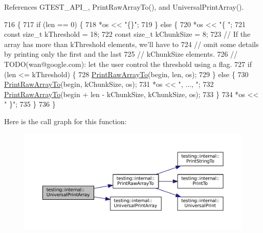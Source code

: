 References G\+T\+E\+S\+T\+\_\+\+A\+P\+I\+\_\+, Print\+Raw\+Array\+To(), and Universal\+Print\+Array().


\begin{DoxyCode}
716                                                                      \{
717   \textcolor{keywordflow}{if} (len == 0) \{
718     *os << \textcolor{stringliteral}{"\{\}"};
719   \} \textcolor{keywordflow}{else} \{
720     *os << \textcolor{stringliteral}{"\{ "};
721     \textcolor{keyword}{const} \textcolor{keywordtype}{size\_t} kThreshold = 18;
722     \textcolor{keyword}{const} \textcolor{keywordtype}{size\_t} kChunkSize = 8;
723     \textcolor{comment}{// If the array has more than kThreshold elements, we'll have to}
724     \textcolor{comment}{// omit some details by printing only the first and the last}
725     \textcolor{comment}{// kChunkSize elements.}
726     \textcolor{comment}{// TODO(wan@google.com): let the user control the threshold using a flag.}
727     \textcolor{keywordflow}{if} (len <= kThreshold) \{
728       \hyperlink{namespacetesting_1_1internal_ad3013b6b4c825edee9fe18ff1d982faa}{PrintRawArrayTo}(begin, len, os);
729     \} \textcolor{keywordflow}{else} \{
730       \hyperlink{namespacetesting_1_1internal_ad3013b6b4c825edee9fe18ff1d982faa}{PrintRawArrayTo}(begin, kChunkSize, os);
731       *os << \textcolor{stringliteral}{", ..., "};
732       \hyperlink{namespacetesting_1_1internal_ad3013b6b4c825edee9fe18ff1d982faa}{PrintRawArrayTo}(begin + len - kChunkSize, kChunkSize, os);
733     \}
734     *os << \textcolor{stringliteral}{" \}"};
735   \}
736 \}
\end{DoxyCode}
Here is the call graph for this function\+:
\nopagebreak
\begin{figure}[H]
\begin{center}
\leavevmode
\includegraphics[width=350pt]{namespacetesting_1_1internal_ad79d71c3110f8eb24ab352d68f29436a_cgraph}
\end{center}
\end{figure}
\mbox{\label{namespacetesting_1_1internal_a72c997dbd2c562110b2cb56c359decfa}} 
